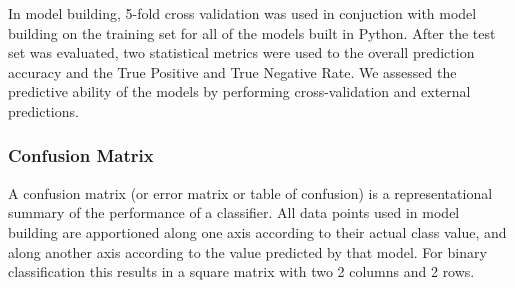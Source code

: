 



In model building, 5-fold cross validation was used in conjuction with model building on the training set for all of the models built in Python. After the test set was evaluated, two statistical metrics were used to the overall prediction accuracy and the True Positive and True Negative Rate. We assessed the predictive ability of the models by performing cross-validation and external predictions.

\subsubsection{Confusion Matrix}

A confusion matrix (or error matrix or table of confusion) is a representational summary of the performance of a classifier. All data points used in model building are apportioned along one axis according to their actual class value, and along another axis according to the value predicted by that model. For binary classification this results in a square matrix with two 2 columns and 2 rows.

